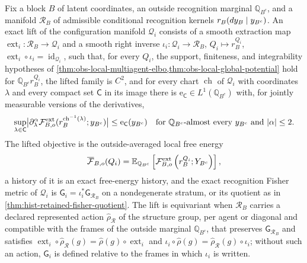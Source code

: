 Fix a block $B$ of latent coordinates, an outside recognition marginal
$\mathbb Q_{B^c}$, and a manifold $\mathscr R_B$ of admissible conditional recognition
kernels $r_B(dy_B\mid y_{B^c})$.  An exact lift of the configuration manifold
$\mathcal Q_i$ consists of a smooth extraction map
$\operatorname{ext}_i:\mathscr R_B\to\mathcal Q_i$ and a smooth right inverse
$\iota_i:\mathcal Q_i\to\mathscr R_B$, $Q_i\mapsto r_B^{Q_i}$,
$\operatorname{ext}_i\circ\iota_i=\operatorname{id}_{\mathcal Q_i}$, such that, for every
$Q_i$, the support, finiteness, and integrability hypotheses of
\cref{thm:obs-local-multiagent-elbo,thm:obs-local-global-potential} hold for
$\mathbb Q_{B^c}r_B^{Q_i}$, the lifted family is $C^2$, and for every chart
$\operatorname{ch}$ of $\mathcal Q_i$ with coordinates $\lambda$ and every compact set
$\mathsf C$ in its image there is $\mathrm e_{\mathsf C}\in L^1(\mathbb Q_{B^c})$ with,
for jointly measurable versions of the derivatives,
\begin{equation}
\sup_{\lambda\in\mathsf C}
\bigl|\partial_\lambda^\alpha\mathcal F^{\rm ext}_{B,o}
(r_B^{\operatorname{ch}^{-1}(\lambda)};y_{B^c})\bigr|
\leq\mathrm e_{\mathsf C}(y_{B^c})
\quad\text{for }\mathbb Q_{B^c}\text{-almost every }y_{B^c}
\text{ and }|\alpha|\leq2.
\label{eq:hist-chartwise-vfe-envelope}
\end{equation}
The lifted objective is the outside-averaged local free energy
\begin{equation}
\overline{\mathcal F}_{B,o}(Q_i)
=\mathbb E_{\mathbb Q_{B^c}}\left[\mathcal F^{\rm ext}_{B,o}\left(r_B^{Q_i};Y_{B^c}\right)\right],
\label{eq:hist-outside-averaged-local-vfe}
\end{equation}
a history of it is an exact free-energy history, and the exact recognition Fisher metric
of $\mathcal Q_i$ is $\mathsf G_i=\iota_i^*\mathsf G_{\mathscr R_B}$ on a nondegenerate
stratum, or its quotient as in \cref{thm:hist-retained-fisher-quotient}. The lift is
equivariant when $\mathscr R_B$ carries a declared represented action
$\widehat\rho_{\mathscr R}$ of the structure group, per agent or diagonal and compatible
with the frames of the outside marginal $\mathbb Q_{B^c}$, that preserves
$\mathsf G_{\mathscr R_B}$ and satisfies
$\operatorname{ext}_i\circ\widehat\rho_{\mathscr R}(g)=\widehat\rho(g)\circ\operatorname{ext}_i$
and $\iota_i\circ\widehat\rho(g)=\widehat\rho_{\mathscr R}(g)\circ\iota_i$; without such
an action, $\mathsf G_i$ is defined relative to the frames in which $\iota_i$ is written.

